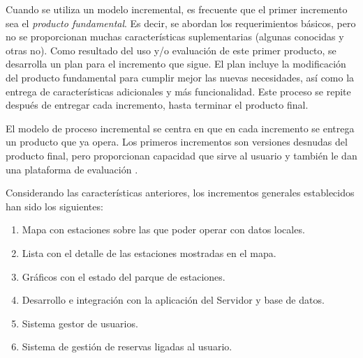 Cuando se utiliza un modelo incremental, es frecuente que el primer incremento sea el \emph{producto fundamental}. Es decir, se abordan los requerimientos básicos, pero no se proporcionan muchas características suplementarias (algunas conocidas y otras no). Como resultado del uso y/o evaluación de este primer producto, se desarrolla un plan para el incremento que sigue. El plan incluye la modificación del producto fundamental para cumplir mejor las nuevas necesidades, así como la entrega de características adicionales y más funcionalidad. Este proceso se repite después de entregar cada incremento, hasta terminar el producto final.

El modelo de proceso incremental se centra en que en cada incremento se entrega un producto que ya opera. Los primeros incrementos son versiones desnudas del producto final, pero proporcionan capacidad que sirve al usuario y también le dan una plataforma de evaluación \cite{Pre10}.

Considerando las características anteriores, los incrementos generales establecidos han sido los siguientes:

\begin{enumerate}  
	\item Mapa con estaciones sobre las que poder operar con datos locales.
	\item Lista con el detalle de las estaciones mostradas en el mapa.
	\item Gráficos con el estado del parque de estaciones.
	\item Desarrollo e integración con la aplicación del Servidor y base de datos.
	\item Sistema gestor de usuarios.
	\item Sistema de gestión de reservas ligadas al usuario.
\end{enumerate}

